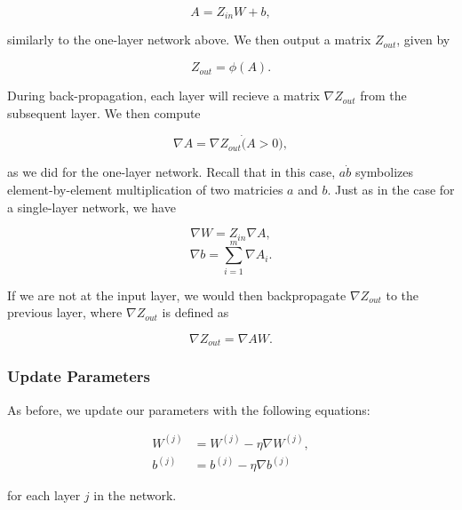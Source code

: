 $$ A = Z_{in} W + b, $$

similarly to the one-layer network above. We then output a matrix $Z_{out}$, given by

$$ Z_{out} = \phi(A).$$

During back-propagation, each layer will recieve a matrix $\nabla Z_{out}$ from
the subsequent layer. We then compute

$$ \nabla A = \nabla Z_{out} \dot (A > 0), $$

as we did for the one-layer network. Recall that in this case, $a \dot b$
symbolizes element-by-element multiplication of two matricies $a$ and $b$.
Just as in the case for a single-layer network, we have

$$ \nabla W = Z_{in} \nabla A, $$
$$ \nabla b = \sum_{i=1}^m \nabla A_i. $$

If we are not at the input layer, we would then backpropagate $\nabla Z_{out}$
to the previous layer, where $\nabla Z_{out}$ is defined as

$$ \nabla Z_{out} = \nabla A W. $$

\subsubsection{Update Parameters}
As before, we update our parameters with the following equations:

\begin{align*}
W^{(j)} &= W^{(j)} - \eta \nabla W^{(j)},\\
b^{(j)} &= b^{(j)} - \eta \nabla b^{(j)}
\end{align*}

for each layer $j$ in the network.
